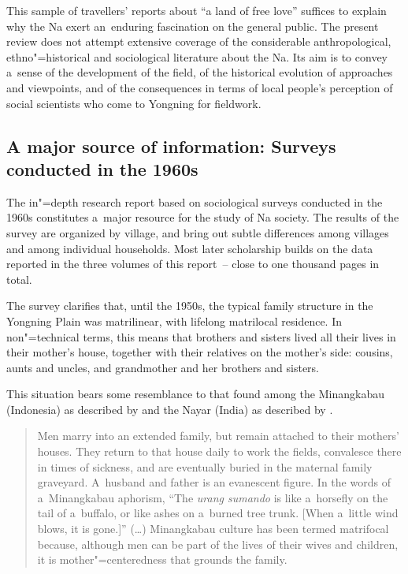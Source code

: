 {\noindent}This sample of travellers’ reports about “a land of free love” suffices to explain why the Na exert an~enduring fascination on the general public. The present review does not attempt extensive coverage of the considerable anthropological, ethno"=historical and sociological literature about the Na. Its aim is to convey a~sense of the development of the field, of the historical evolution of approaches and viewpoints, and of the consequences in terms of local people’s perception of social scientists who come to Yongning for fieldwork. 


\subsection[Surveys conducted in the 1960s]{A major source of information: Surveys conducted in the 1960s}
\label{sec:themainsourceofinformationonnafamilystructuresurveysconductedinthe1960s}

The in"=depth research report based on sociological surveys conducted in the 1960s
\citep{bianjizuguojiaminweiminzushehuilishidiaochayunnanshengbianjizu1986} constitutes a~major
resource for the study of Na society. The results of the survey are organized by village, and bring
out subtle differences among villages and among individual households. Most later scholarship
builds on the data reported in the three volumes of this report~-- close to one thousand pages in
total.

The survey clarifies that, until the 1950s, the typical family structure in the Yongning Plain was
matrilinear, with lifelong matrilocal residence. In non"=technical terms, this means that brothers and sisters lived all their lives in their mother’s house, together with their
relatives on the mother’s side: cousins, aunts and uncles, and grandmother and her brothers and
sisters. 

This situation bears some resemblance to that found among the Minangkabau (Indonesia) as described by \citet{hadler2008} and the Nayar (India) as described by \citet{fuller1976}. 

\begin{quotation}
	Men marry into an extended family, but remain attached to their mothers' houses. They return to that house daily to work the fields, convalesce there in times of sickness, and are eventually buried in the maternal family graveyard. A~husband and father is an evanescent figure. In the words of a~Minangkabau aphorism, “The \textit{urang sumando} is like a~horsefly on the tail of a~buffalo, or like ashes on a~burned tree trunk. [When a~little wind blows, it is gone.]” ({\dots}) Minangkabau culture has been termed matrifocal because, although men can be part of the lives of their wives and children, it is mother"=centeredness that grounds the family. \citep[6]{hadler2008}
\end{quotation}

